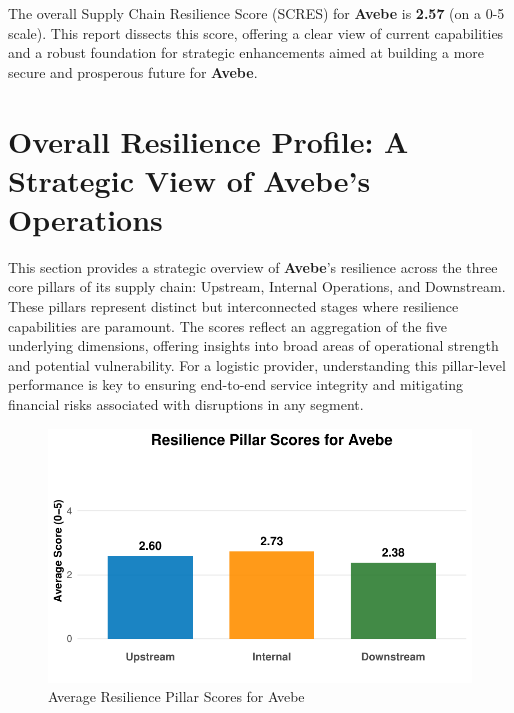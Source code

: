 \documentclass[
  oneside,
  open=any,
  fontsize=11pt]{scrbook}
\begin{document}
The overall Supply Chain Resilience Score (SCRES) for \textbf{Avebe} is
\textbf{2.57} (on a 0-5 scale). This report dissects this score,
offering a clear view of current capabilities and a robust foundation
for strategic enhancements aimed at building a more secure and
prosperous future for \textbf{Avebe}.

\chapter{Overall Resilience Profile: A Strategic View of Avebe's
Operations}\label{overall-resilience-profile-a-strategic-view-of-avebes-operations}

This section provides a strategic overview of \textbf{Avebe}'s
resilience across the three core pillars of its supply chain: Upstream,
Internal Operations, and Downstream. These pillars represent distinct
but interconnected stages where resilience capabilities are paramount.
The scores reflect an aggregation of the five underlying dimensions,
offering insights into broad areas of operational strength and potential
vulnerability. For a logistic provider, understanding this pillar-level
performance is key to ensuring end-to-end service integrity and
mitigating financial risks associated with disruptions in any segment.

\begin{figure}[H]

{\centering \includegraphics[width=1\linewidth,height=\textheight,keepaspectratio]{example_3_files/figure-pdf/pillar-scores-chart-1.pdf}

}

\caption{Average Resilience Pillar Scores for Avebe}

\end{figure}%
\end{document}
